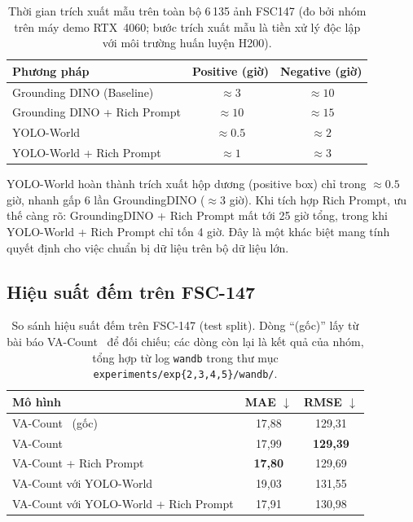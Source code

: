 \documentclass[a4paper,12pt]{report}
\numberwithin{figure}{chapter}
\numberwithin{table}{chapter}
\begin{document}
\begin{table}[H]
\centering
\renewcommand{\arraystretch}{1.2}
\begin{tabular}{|l|c|c|}
\hline
\rowcolor[HTML]{EFEFEF}
\textbf{Phương pháp} & \textbf{Positive (giờ)} & \textbf{Negative (giờ)} \\
\hline
Grounding DINO (Baseline) & $\approx 3$ & $\approx 10$ \\
\hline
Grounding DINO + Rich Prompt & $\approx 10$ & $\approx 15$ \\
\hline
YOLO-World & $\approx 0.5$ & $\approx 2$ \\
\hline
YOLO-World + Rich Prompt & $\approx 1$ & $\approx 3$ \\
\hline
\end{tabular}
\caption{Thời gian trích xuất mẫu trên toàn bộ 6\,135 ảnh FSC147 (đo bởi nhóm trên máy demo RTX~4060; bước trích xuất mẫu là tiền xử lý độc lập với môi trường huấn luyện H200).}
\label{tab:extract_time}
\end{table}

YOLO-World hoàn thành trích xuất hộp dương (positive box) chỉ trong $\approx 0{.}5$ giờ, nhanh gấp 6 lần GroundingDINO ($\approx 3$ giờ). Khi tích hợp Rich Prompt, ưu thế càng rõ: GroundingDINO + Rich Prompt mất tới 25 giờ tổng, trong khi YOLO-World + Rich Prompt chỉ tốn 4 giờ. Đây là một khác biệt mang tính quyết định cho việc chuẩn bị dữ liệu trên bộ dữ liệu lớn.

\subsection{Hiệu suất đếm trên FSC-147}

\begin{table}[H]
\centering
\renewcommand{\arraystretch}{1.2}
\begin{tabular}{|l|c|c|}
\hline
\rowcolor[HTML]{EFEFEF}
\textbf{Mô hình} & \textbf{MAE} $\downarrow$ & \textbf{RMSE} $\downarrow$ \\
\hline
VA-Count~\cite{vacount} (gốc) & 17,88 & 129,31 \\
\hline
VA-Count & 17,99 & \textbf{129,39} \\
\hline
VA-Count + Rich Prompt & \textbf{17,80} & 129,69 \\
\hline
VA-Count với YOLO-World & 19,03 & 131,55 \\
\hline
VA-Count với YOLO-World + Rich Prompt & 17,91 & 130,98 \\
\hline
\end{tabular}
\caption{So sánh hiệu suất đếm trên FSC-147 (test split). Dòng ``(gốc)'' lấy từ bài báo VA-Count~\cite{vacount} để đối chiếu; các dòng còn lại là kết quả của nhóm, tổng hợp từ log \texttt{wandb} trong thư mục \mbox{\texttt{experiments/exp\{2,3,4,5\}/wandb/}}.}
\label{tab:counting_perf}
\end{table}
\end{document}
